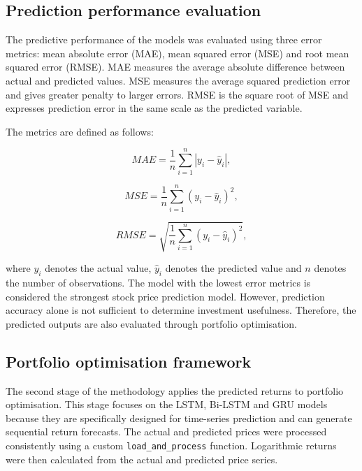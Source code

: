 \subsection{Prediction performance evaluation}

The predictive performance of the models was evaluated using three error metrics: mean absolute error (MAE), mean squared error (MSE) and root mean squared error (RMSE). MAE measures the average absolute difference between actual and predicted values. MSE measures the average squared prediction error and gives greater penalty to larger errors. RMSE is the square root of MSE and expresses prediction error in the same scale as the predicted variable.

The metrics are defined as follows:

\begin{equation}
MAE = \frac{1}{n}\sum_{i=1}^{n}|y_i-\hat{y}_i|,
\end{equation}

\begin{equation}
MSE = \frac{1}{n}\sum_{i=1}^{n}(y_i-\hat{y}_i)^2,
\end{equation}

\begin{equation}
RMSE = \sqrt{\frac{1}{n}\sum_{i=1}^{n}(y_i-\hat{y}_i)^2},
\end{equation}

\noindent where $y_i$ denotes the actual value, $\hat{y}_i$ denotes the predicted value and $n$ denotes the number of observations. The model with the lowest error metrics is considered the strongest stock price prediction model. However, prediction accuracy alone is not sufficient to determine investment usefulness. Therefore, the predicted outputs are also evaluated through portfolio optimisation.

\subsection{Portfolio optimisation framework}

The second stage of the methodology applies the predicted returns to portfolio optimisation. This stage focuses on the LSTM, Bi-LSTM and GRU models because they are specifically designed for time-series prediction and can generate sequential return forecasts. The actual and predicted prices were processed consistently using a custom \texttt{load\_and\_process} function. Logarithmic returns were then calculated from the actual and predicted price series.

